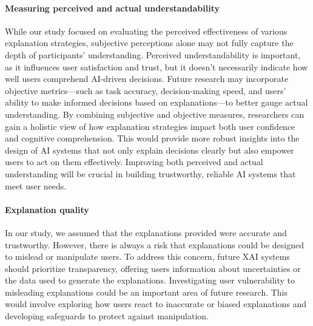 \paragraph{Measuring perceived and actual understandability}
While our study focused on evaluating the perceived effectiveness of various explanation strategies, subjective perceptions alone may not fully capture the depth of participants' understanding. Perceived understandability is important, as it influences user satisfaction and trust, but it doesn't necessarily indicate how well users comprehend AI-driven decisions. Future research may incorporate objective metrics---such as task accuracy, decision-making speed, and users' ability to make informed decisions based on explanations---to better gauge actual understanding. By combining subjective and objective measures, researchers can gain a holistic view of how explanation strategies impact both user confidence and cognitive comprehension. This would provide more robust insights into the design of AI systems that not only explain decisions clearly but also empower users to act on them effectively. Improving both perceived and actual understanding will be crucial in building trustworthy, reliable AI systems that meet user needs.

\paragraph{Explanation quality}
In our study, we assumed that the explanations provided were accurate and trustworthy. However, there is always a risk that explanations could be designed to mislead or manipulate users. To address this concern, future XAI systems should prioritize transparency, offering users information about uncertainties or the data used to generate the explanations. Investigating user vulnerability to misleading explanations could be an important area of future research. This would involve exploring how users react to inaccurate or biased explanations and developing safeguards to protect against manipulation.
